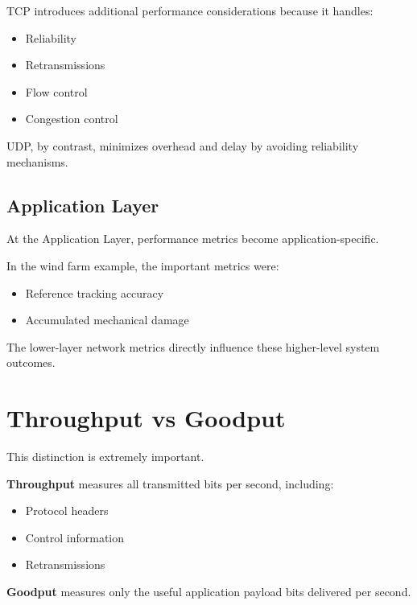 TCP introduces additional performance considerations because it handles:
\begin{itemize}[leftmargin=1.5em]
    \item Reliability
    \item Retransmissions
    \item Flow control
    \item Congestion control
\end{itemize}

UDP, by contrast, minimizes overhead and delay by avoiding reliability
mechanisms.

\subsection{Application Layer}

At the Application Layer, performance metrics become application-specific.

In the wind farm example, the important metrics were:
\begin{itemize}[leftmargin=1.5em]
    \item Reference tracking accuracy
    \item Accumulated mechanical damage
\end{itemize}

The lower-layer network metrics directly influence these higher-level system
outcomes.

\section{Throughput vs Goodput}

This distinction is extremely important.

\begin{mdframed}[backgroundcolor=lightgray, linewidth=0pt,
innertopmargin=8pt, innerbottommargin=8pt]
\textbf{Throughput} measures all transmitted bits per second, including:
\begin{itemize}
    \item Protocol headers
    \item Control information
    \item Retransmissions
\end{itemize}

\textbf{Goodput} measures only the useful application payload bits delivered
per second.
\end{mdframed}

